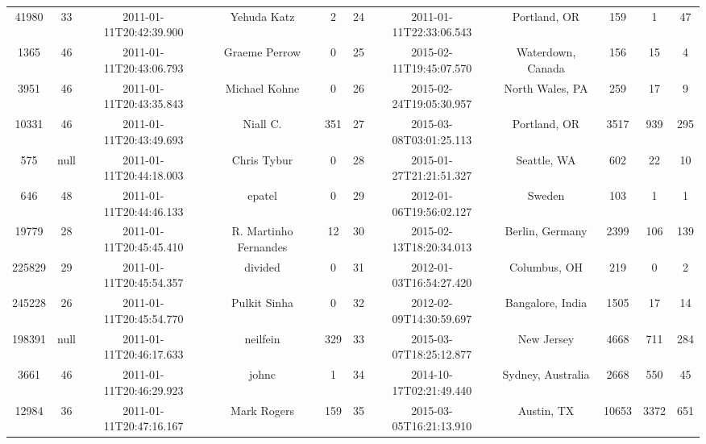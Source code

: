 \documentclass[12pt,a4paper,twoside,openright,titlepage,final]{article}
\begin{document}
\begin{enumerate}
\begin{table}[htbp!]
{\begin{tabular}{@{}ccccccccccc@{}}
			41980     & 33   & 2011-01-11T20:42:39.900 & Yehuda Katz           & 2         & 24    & 2011-01-11T22:33:06.543 & Portland, OR                     & 159        & 1       & 47    \\
			1365      & 46   & 2011-01-11T20:43:06.793 & Graeme Perrow         & 0         & 25    & 2015-02-11T19:45:07.570 & Waterdown, Canada                & 156        & 15      & 4     \\
			3951      & 46   & 2011-01-11T20:43:35.843 & Michael Kohne         & 0         & 26    & 2015-02-24T19:05:30.957 & North Wales, PA                  & 259        & 17      & 9     \\
			10331     & 46   & 2011-01-11T20:43:49.693 & Niall C.              & 351       & 27    & 2015-03-08T03:01:25.113 & Portland, OR                     & 3517       & 939     & 295   \\
			575       & null & 2011-01-11T20:44:18.003 & Chris Tybur           & 0         & 28    & 2015-01-27T21:21:51.327 & Seattle, WA                      & 602        & 22      & 10    \\
			646       & 48   & 2011-01-11T20:44:46.133 & epatel                & 0         & 29    & 2012-01-06T19:56:02.127 & Sweden                           & 103        & 1       & 1     \\
			19779     & 28   & 2011-01-11T20:45:45.410 & R. Martinho Fernandes & 12        & 30    & 2015-02-13T18:20:34.013 & Berlin, Germany                  & 2399       & 106     & 139   \\
			225829    & 29   & 2011-01-11T20:45:54.357 & divided               & 0         & 31    & 2012-01-03T16:54:27.420 & Columbus, OH                     & 219        & 0       & 2     \\
			245228    & 26   & 2011-01-11T20:45:54.770 & Pulkit Sinha          & 0         & 32    & 2012-02-09T14:30:59.697 & Bangalore, India                 & 1505       & 17      & 14    \\
			198391    & null & 2011-01-11T20:46:17.633 & neilfein              & 329       & 33    & 2015-03-07T18:25:12.877 & New Jersey                       & 4668       & 711     & 284   \\
			3661      & 46   & 2011-01-11T20:46:29.923 & johnc                 & 1         & 34    & 2014-10-17T02:21:49.440 & Sydney, Australia                & 2668       & 550     & 45    \\
			12984     & 36   & 2011-01-11T20:47:16.167 & Mark Rogers           & 159       & 35    & 2015-03-05T16:21:13.910 & Austin, TX                       & 10653      & 3372    & 651   \\

\end{tabular}}
\end{table}
\end{enumerate}
\end{document}
